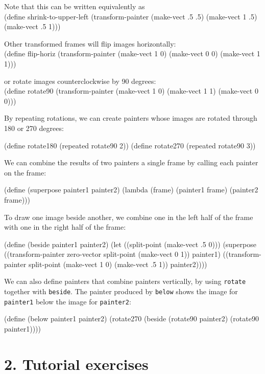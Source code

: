 \noindent
Note that this can be written equivalently as\\
\beginlisp
(define shrink-to-upper-left
  (transform-painter (make-vect .5 .5) (make-vect 1 .5) (make-vect .5 1)))
\endlisp

Other transformed frames will flip images horizontally:\\
\beginlisp
(define flip-horiz
  (transform-painter (make-vect 1 0)
                     (make-vect 0 0)
                     (make-vect 1 1)))
\endlisp

\noindent
or rotate images counterclockwise by 90 degrees:\\
\beginlisp
(define rotate90
  (transform-painter (make-vect 1 0)
                     (make-vect 1 1)
                     (make-vect 0 0)))
\endlisp

By repeating rotations, we can create painters whose images are
rotated through 180 or 270 degrees:

\beginlisp
(define rotate180 (repeated rotate90 2))
(define rotate270 (repeated rotate90 3))
\endlisp

We can combine the results of two painters a single frame by
calling each painter on the frame:

\beginlisp
(define (superpose painter1 painter2)
  (lambda (frame)
    (painter1 frame)
    (painter2 frame)))
\endlisp

To draw one image beside another, we combine one in the left half
of the frame with one in the right half of the frame:

\beginlisp
(define (beside painter1 painter2)
  (let ((split-point (make-vect .5 0)))
    (superpose
     ((transform-painter zero-vector
                         split-point
                         (make-vect 0 1))
      painter1)
     ((transform-painter split-point
                         (make-vect 1 0)
                         (make-vect .5 1))
      painter2))))

\endlisp

We can also define painters that combine painters vertically, by
using {\tt rotate} together with {\tt beside}.  The painter produced
by {\tt below} shows the image for {\tt painter1} below the image
for {\tt painter2}:

\beginlisp
(define (below painter1 painter2)
  (rotate270 (beside (rotate90 painter2)
                     (rotate90 painter1))))
\endlisp

\section{2. Tutorial exercises}


